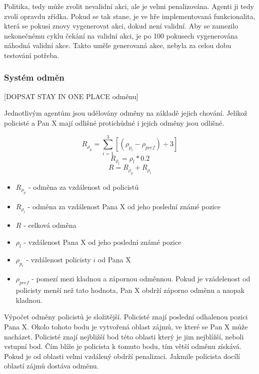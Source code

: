 Politika, tedy může zvolit nevalidní akci, ale je velmi penalizována.
Agenti ji tedy zvolí opravdu zřídka.
Pokud se tak stane, je ve hře implementovaná funkcionalita, která se pokusi znovy vygenerovat akci, dokud není validní.
Aby se zamezilo nekonečnému cyklu čekání na validní akci, je po 100 pokusech vygenerována náhodná validní akce.
Takto uměle generovaná akce, nebyla za celou dobu testování potřeba.

\subsubsection*{Systém odměn}

{\color {red} [DOPSAT STAY IN ONE PLACE odměnu]}

Jednotlivým agentům jsou udělovány odměny na základě jejich chování.
Jelikož policisté a Pan X mají odlišné protichůdné i jejich odměny jsou odlišné.

\begin{equation}
    \label{eq:odmena_za_vzdalenost_od_policistu}
  R_{\rho_p} = \sum_{i=1}^{3}[(\rho_{p_i} - \rho_{pref}) \div 3]
\end{equation}
\begin{equation}
    \label{eq:odmena_za_vzdalenost_od_posledni_pozice}
  R_{\rho_l} = \rho_l * 0.2
\end{equation}
  \begin{equation}
    \label{eq:celkova_odmena}
  R = R_{\rho_p} + R_{\rho_l}
\end{equation}

\begin{itemize}
  \item $R_{\rho_p}$ - odměna za vzdálenost od policistů
  \item $R_{\rho_l}$ - odměna za vzdálenost Pana X od jeho poslední známé pozice
  \item $R$ - celková odměna
  \item $\rho_l$ - vzdálenost Pana X od jeho poslední známé pozice
  \item $\rho_{p_i}$ - vzdálenost policisty $i$ od Pana X
  \item $\rho_{pref}$ - pomezí mezi kladnou a zápornou odměnnou.
  Pokud je vzádelenost od policisty menší než tato hodnota, Pan X obdrží záporno odměnu a naopak kladnou.
\end{itemize}

Výpočet odměny policistů je složitější.
Policisté znají poslední odhalenou pozici Pana X\@.
Okolo tohoto bodu je vytvořená oblast zájmů, ve které se Pan X může nacházet.
Policisté znají nejbližší bod této oblasti který je jim nejblížší, neboli vstupní bod.
Čím blíže je policista k tomuto bodu, tím větší odměnu získává.
Pokud je od oblasti velmi vzdálený obdrží penalizaci.
Jakmile policista docílí oblastí zájmů dostáva odměnu.

